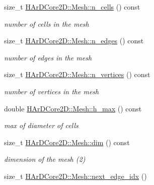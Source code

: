 \begin{DoxyCompactItemize}
size\+\_\+t \hyperlink{group__Mesh_ga2202a0715196c41356692d8adcfe3893}{H\+Ar\+D\+Core2\+D\+::\+Mesh\+::n\+\_\+cells} () const
\begin{DoxyCompactList}\small\item\em number of cells in the mesh \end{DoxyCompactList}\item 
\mbox{\label{group__Mesh_ga55a1cd5db98bbce8c73ab86b4527859c}} 
size\+\_\+t \hyperlink{group__Mesh_ga55a1cd5db98bbce8c73ab86b4527859c}{H\+Ar\+D\+Core2\+D\+::\+Mesh\+::n\+\_\+edges} () const
\begin{DoxyCompactList}\small\item\em number of edges in the mesh \end{DoxyCompactList}\item 
\mbox{\label{group__Mesh_gadb4a39bfc5444953e7799d28b8e37563}} 
size\+\_\+t \hyperlink{group__Mesh_gadb4a39bfc5444953e7799d28b8e37563}{H\+Ar\+D\+Core2\+D\+::\+Mesh\+::n\+\_\+vertices} () const
\begin{DoxyCompactList}\small\item\em number of vertices in the mesh \end{DoxyCompactList}\item 
\mbox{\label{group__Mesh_ga5f08b04ebac390a2ab8dfe956a90ebbf}} 
double \hyperlink{group__Mesh_ga5f08b04ebac390a2ab8dfe956a90ebbf}{H\+Ar\+D\+Core2\+D\+::\+Mesh\+::h\+\_\+max} () const
\begin{DoxyCompactList}\small\item\em max of diameter of cells \end{DoxyCompactList}\item 
\mbox{\label{group__Mesh_gaecd909db5f3ab863010382cf6b71ec58}} 
size\+\_\+t \hyperlink{group__Mesh_gaecd909db5f3ab863010382cf6b71ec58}{H\+Ar\+D\+Core2\+D\+::\+Mesh\+::dim} () const
\begin{DoxyCompactList}\small\item\em dimension of the mesh (2) \end{DoxyCompactList}\item 
\mbox{\label{group__Mesh_ga950e099c278cd367de1a87c6dcaefafe}} 
size\+\_\+t \hyperlink{group__Mesh_ga950e099c278cd367de1a87c6dcaefafe}{H\+Ar\+D\+Core2\+D\+::\+Mesh\+::next\+\_\+edge\+\_\+idx} ()

\end{DoxyCompactItemize}
